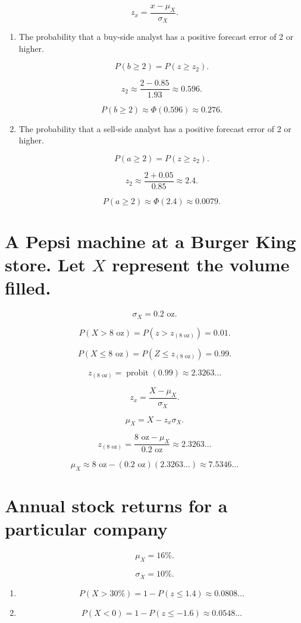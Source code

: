 \documentclass[12pt]{article}
\DeclareMathOperator{\probit}{probit}
\begin{document}
\[z_x=\frac{x-\mu_X}{\sigma_X}.\]
\begin{enumerate}
\item The probability that a buy-side analyst has a positive forecast error of 2 or higher.

\[P(b\geq 2)=P(z\geq z_2).\]

\[z_2\approx\frac{2-0.85}{1.93}\approx 0.596.\]

\[P(b\geq 2)\approx\Phi(0.596)\approx 0.276.\]
\item The probability that a sell-side analyst has a positive forecast error of 2 or higher.

\[P(a\geq 2)=P(z\geq z_2).\]

\[z_2\approx\frac{2+0.05}{0.85}\approx 2.4.\]

\[P(a\geq 2)\approx\Phi(2.4)\approx 0.0079.\]
\end{enumerate}
\section{A Pepsi machine at a Burger King store.
Let $X$ represent the volume filled.}

\[\sigma_X=0.2\text{ oz}.\]

\[P(X>8\text{ oz})=P\left(z>z_{(8\text{ oz})}\right)=0.01.\]

\[P(X\leq 8\text{ oz})=P\left(Z\leq z_{(8\text{ oz})}\right)=0.99.\]

\[z_{(8\text{ oz})}=\probit(0.99)\approx 2.3263\dots\]

\[z_x=\frac{X-\mu_X}{\sigma_X}.\]

\[\mu_X=X-z_x\sigma_X.\]

\[z_{(8\text{ oz})}=\frac{8\text{ oz}-\mu_X}{0.2\text{ oz}}\approx 2.3263\dots\]

\[\mu_X\approx 8\text{ oz}-(0.2\text{ oz})(2.3263\dots)\approx 7.5346\dots\]
\section{Annual stock returns for a particular company}
\[\mu_X=16\%.\]

\[\sigma_X=10\%.\]

\begin{enumerate}
    \item\[P(X>30\%)=1-P(z\leq 1.4)\approx 0.0808\dots\]
    \item\[P(X<0)=1-P(z\leq -1.6)\approx 0.0548\dots\]
\end{enumerate}
\end{document}
